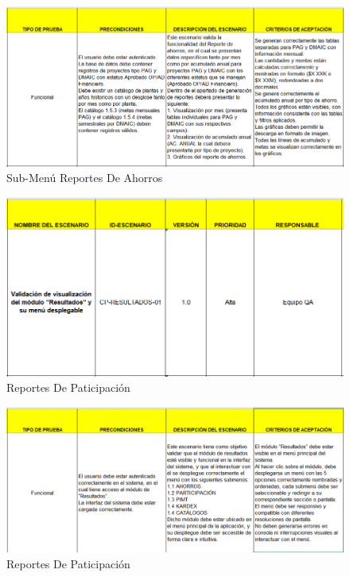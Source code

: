 \documentclass[12pt,letterpaper,spanish, xcolor=table]{report}
\numberwithin{figure}{subsection}
\begin{document}
	\begin{figure}[H]
		\centering
		\includegraphics[width=1.0\textwidth]
		{Imagenes/CenterPoint/EReporteA2.png}
		\caption{Sub-Menú Reportes De Ahorros}\label{a3}
	\end{figure}
	
	\begin{figure}[H]
		\centering
		\includegraphics[width=1.0\textwidth]
		{Imagenes/CenterPoint/EResultado.png}
		\caption{Reportes De Paticipación}\label{a3}
	\end{figure}
	
	\begin{figure}[H]
		\centering
		\includegraphics[width=1.0\textwidth]
		{Imagenes/CenterPoint/EResultado2.png}
		\caption{Reportes De Paticipación}\label{a3}
	\end{figure}
	
\end{document}
